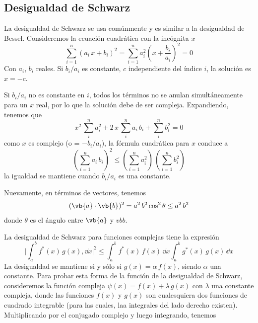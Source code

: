 \subsection{Desigualdad de Schwarz}
 La desigualdad de Schwarz se usa comúnmente y es similar a la desigualdad de Bessel. Consideremos la ecuación cuadrática con la incógnita $x$
 \begin{equation}
\sum_{i=1}^{n} (a_{i} \, x + b_{i})^{2} = \sum_{i=1}^{n} a_{i}^{2} \left( x + \frac{b_{i}}{a_{i}} \right)^{2} = 0
\label{eq:ecuacion_10_74}
\end{equation}
Con $a_{i}$, $b_{i}$ reales. Si $b_{i}/a_{i}$ es constante, $c$ independiente del índice $i$, la solución es $x= - c$. 
\par
Si $b_{i}/a_{i}$ no es constante en $i$, todos los términos no se anulan simultáneamente para un $x$ real, por lo que la solución debe de ser compleja. Expandiendo, tenemos que
\begin{equation}
x^{2} \, \sum_{i}^{n} a_{i}^{2} + 2 \, x \, \sum_{i}^{n} a_{i} \, b_{i} + \sum_{i}^{n} b_{i}^{2} = 0
\label{eq:ecuacion_10_75}
\end{equation}
como $x$ es complejo (o = $-b_{i}/a_{i}$), la fórmula cuadrática para $x$ conduce a 
\begin{equation}
\left( \sum_{i=1}^{n} a_{i} \, b_{i} \right)^{2} \leq \left( \sum_{i=1}^{n} a_{i}^{2} \right) \, \left( \sum_{i=1}^{n} b_{i}^{2} \right)
\label{eq:ecuacion_10_76}
\end{equation}
la igualdad se mantiene cuando $b_{i}/a_{i}$ es una constante.
\par
Nuevamente, en términos de vectores, tenemos
\begin{equation}
( \vb{a} \cdot \vb{b} )^{2} =  a^{2} \, b^{2} \cos^{2} \theta \leq a^{2} \, b^{2}
\label{eq:ecuacion_10_77}
\end{equation}
donde $\theta$ es el ángulo entre $\vb{a}$ y $vb{b}$.
\par
La desigualdad de Schwarz para funciones complejas tiene la expresión
\begin{equation}
\Bigg\vert \int_{a}^{b} f^{*} (x) \, g(x) , \dd x \Bigg\vert^{2} \leq \int_{a}^{b} f^{*}(x) \, f(x) \, \dd x \int_{a}^{b} g^{*}(x) \, g(x) \, \dd x
\label{eq:ecuacion_10_78}
\end{equation}
La desigualdad se mantiene si y sólo si $g(x) = \alpha \, f(x)$, siendo $\alpha$ una constante. Para probar esta forma de la función de la desigualdad de Schwarz, consideremos la función compleja $\psi(x) = f(x) + \lambda \, g(x)$ con $\lambda$ una constante compleja, donde las funciones $f(x)$ y $g(x)$ son cualesquiera dos funciones de cuadrado integrable (para las cuales, laa integrales del lado derecho existen). Multiplicando por el conjugado complejo y luego integrando, tenemos
